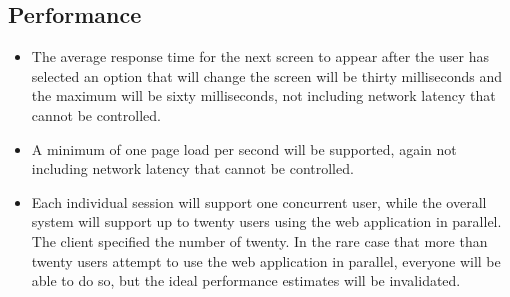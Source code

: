 \subsection{Performance}
\begin{itemize}
\item The average response time for the next screen to appear after the user has selected an option that will change the screen will be thirty milliseconds and the maximum will be sixty milliseconds, not including network latency that cannot be controlled.
\item A minimum of one page load per second will be supported, again not including network latency that cannot be controlled.
\item Each individual session will support one concurrent user, while the overall system will support up to twenty users using the web application in parallel. The client specified the number of twenty. In the rare case that more than twenty users attempt to use the web application in parallel, everyone will be able to do so, but the ideal performance estimates will be invalidated.
\end{itemize}
